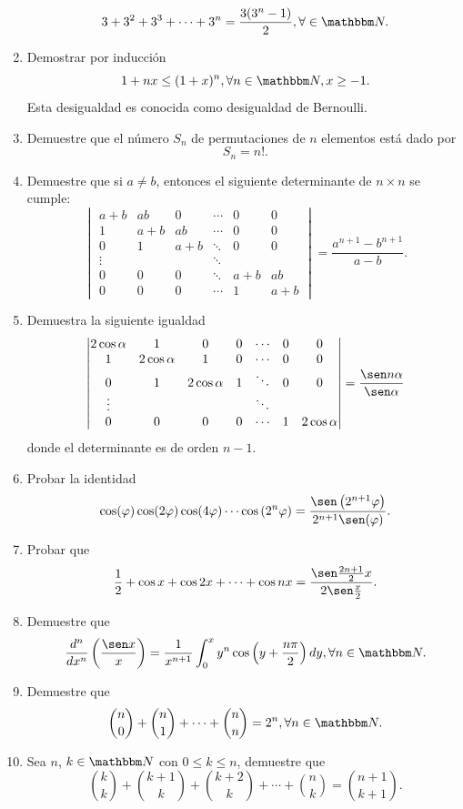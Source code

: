 \begin{enumerate}
    $$3+3^2+3^3+\cdots +3^n=\frac{3(3^n-1)}{2}, \forall \in \NN.$$\newpage
    \item Demostrar por inducción
    $$1+nx \leq (1+x)^n, \forall n \in \NN, x \geq -1.$$
    Esta desigualdad es conocida como desigualdad de Bernoulli.
    \item Demuestre que el número $S_n$ de permutaciones de $n$ elementos está dado por
    $$S_n=n!.$$
    \item Demuestre que si $a \neq b$, entonces el siguiente determinante de $n \times n$ se cumple:
    $$\begin{vmatrix}
        a+b & ab & 0 & \cdots & 0 & 0 \\
        1 & a+b & ab & \cdots & 0 & 0 \\
        0 & 1 & a+b & \ddots & 0 & 0 \\
        \vdots & & & \ddots & \\
        0 & 0 & 0 & \ddots & a+b & ab \\
        0 & 0 & 0 & \cdots & 1 & a+b
    \end{vmatrix} = \frac{a^{n+1}-b^{n+1}}{a-b}.$$
    \item Demuestra la siguiente igualdad
    $$\begin{vmatrix}
        2 \cos \alpha & 1 & 0 & 0 & \cdots & 0 & 0 \\
        1 & 2 \cos \alpha & 1 & 0 & \cdots & 0 & 0 \\
        0 & 1 & 2 \cos \alpha & 1 & \ddots & 0 & 0 \\
        \vdots & & & & \ddots & & \\
        0 & 0 & 0 & 0 & \cdots & 1 & 2 \cos \alpha
    \end{vmatrix} = \frac{\sen n\alpha}{\sen \alpha}$$
    donde el determinante es de orden $n - 1$.
    \item Probar la identidad
    $$\cos (\varphi) \cos (2\varphi) \cos (4\varphi) \cdots \cos \left( 2^n \varphi \right)=\frac{\sen \left( 2^{n+1} \varphi \right)}{2^{n+1} \sen (\varphi)}.$$
    \item Probar que
    $$\frac{1}{2}+\cos x +\cos 2x +\cdots +\cos nx=\frac{ \sen \frac{2n+1}{2}x}{2\sen \frac{x}{2}}.$$
    \item Demuestre que
    $$\frac{d^n}{dx^n}\left( \frac{\sen x}{x} \right) = \frac{1}{x^{n+1}} \int_{0}^{x} y^n \cos \left( y+\frac{n\pi}{2} \right) dy, \forall n \in \NN.$$
    \item Demuestre que
    $$\binom{n}{0}+\binom{n}{1}+\cdots +\binom{n}{n}=2^n, \forall n \in \NN.$$
    \item Sea $n$, $k \in \NN$ con $0 \leq k \leq n$, demuestre que
    $$\binom{k}{k}+\binom{k+1}{k}+\binom{k+2}{k}+\cdots +\binom{n}{k}=\binom{n+1}{k+1}.$$
\end{enumerate}